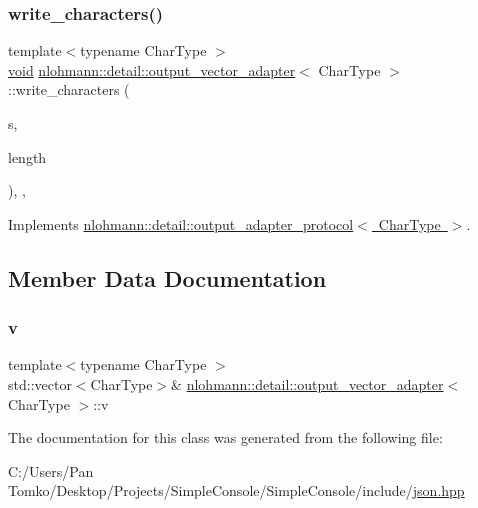 \subsubsection{\texorpdfstring{write\_characters()}{write\_characters()}}
{\footnotesize\ttfamily template$<$typename Char\+Type $>$ \\
\mbox{\hyperlink{namespacenlohmann_1_1detail_a59fca69799f6b9e366710cb9043aa77d}{void}} \mbox{\hyperlink{classnlohmann_1_1detail_1_1output__vector__adapter}{nlohmann\+::detail\+::output\+\_\+vector\+\_\+adapter}}$<$ Char\+Type $>$\+::write\+\_\+characters (\begin{DoxyParamCaption}\item[{const Char\+Type $\ast$}]{s,  }\item[{std\+::size\+\_\+t}]{length }\end{DoxyParamCaption})\hspace{0.3cm}{\ttfamily [inline]}, {\ttfamily [override]}, {\ttfamily [virtual]}}



Implements \mbox{\hyperlink{structnlohmann_1_1detail_1_1output__adapter__protocol_a2f410a164e0eda17cf6561114b0eee4a}{nlohmann\+::detail\+::output\+\_\+adapter\+\_\+protocol$<$ Char\+Type $>$}}.



\subsection{Member Data Documentation}
\mbox{\label{classnlohmann_1_1detail_1_1output__vector__adapter_a9b1ed9fba14e671ae1abb6692560ef3f}} 
\subsubsection{\texorpdfstring{v}{v}}
{\footnotesize\ttfamily template$<$typename Char\+Type $>$ \\
std\+::vector$<$Char\+Type$>$\& \mbox{\hyperlink{classnlohmann_1_1detail_1_1output__vector__adapter}{nlohmann\+::detail\+::output\+\_\+vector\+\_\+adapter}}$<$ Char\+Type $>$\+::v\hspace{0.3cm}{\ttfamily [private]}}



The documentation for this class was generated from the following file\+:\begin{DoxyCompactItemize}
\item 
C\+:/\+Users/\+Pan Tomko/\+Desktop/\+Projects/\+Simple\+Console/\+Simple\+Console/include/\mbox{\hyperlink{json_8hpp}{json.\+hpp}}\end{DoxyCompactItemize}

